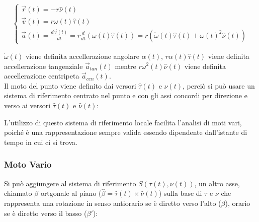 \documentclass{article}
\numberwithin{equation}{subsection}
\begin{document}
\begin{equation}
    \begin{cases}
        \vec{r}(t)=-r\hat{\nu}(t)\\
        \vec{v}(t)=r\omega(t)\hat{\tau}(t)\\
        \vec{a}(t)=\displaystyle\frac{d\vec{v}(t)}{dt}
        =r\frac{d}{dt}(\omega(t)\hat{\tau}(t))
        =r(\dot\omega(t)\hat{\tau}(t)+\omega(t)^{2}\hat{\nu}(t))
    \end{cases}
\end{equation}

$\dot\omega(t)$ viene definita accellerazione angolare $\alpha(t)$, 
$r\alpha(t)\hat{\tau}(t)$ viene definita accellerazione tangenziale 
$\vec{a}_{tan}(t)$ mentre $r\omega^{2}(t)\hat{\nu}(t)$ viene definita 
accellerazione centripeta $\vec{a}_{cen}(t)$.\\
Il moto del punto viene definito dai versori $\hat{\tau}(t)$ e $\hat{\nu}(t)$, 
perciò si può usare un sistema di riferimento centrato nel punto e con gli assi 
concordi per direzione e verso ai versori $\hat{\tau}(t)$ e $\hat{\nu}(t)$:

\begin{center}\end{center}

L'utilizzo di questo sistema di riferimento locale facilita 
l'analisi di moti vari, poiché è una rappresentazione sempre 
valida essendo dipendente dall'istante di tempo in cui ci 
si trova.

\subsubsection{Moto Vario}
Si può aggiungere al sistema di riferimento $S(\tau(t), \nu(t))$, un altro 
asse, chiamato $\beta$ ortgonale al piano ($\hat{\beta}=\hat{\tau}(t)\times\hat{\nu}(t)$) sulla base di $\tau$ e $\nu$ 
che rappresenta una rotazione in senso antiorario se è diretto 
verso l'alto ($\beta$), orario se è diretto verso il basso ($\beta'$):
\end{document}
